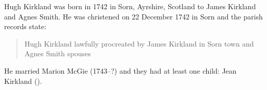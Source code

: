 
Hugh Kirkland was born in 1742 in Sorn, Ayrshire, Scotland to James Kirkland and Agnes Smith.  He was christened on
22 December 1742 in Sorn and the parish records state:\cite{HKirklandBirth}

\begin{quotation}
Hugh Kirkland lawfully procreated by James Kirkland in Sorn town and Agnes Smith spouses
\end{quotation}

He married Marion McGie (1743--?) and they had at least one child: Jean Kirkland ().
